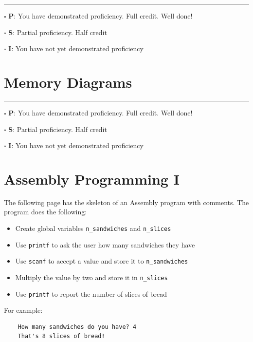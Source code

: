 \documentclass[12pt]{article}
\begin{document}
\vfill

\rule[1ex]{\textwidth}{.1pt}

$\square$ \textbf{P}: You have demonstrated proficiency. Full credit. Well done!

$\square$ \textbf{S}: Partial proficiency. Half credit

$\square$ \textbf{I}: You have not yet demonstrated proficiency

\newpage



\section*{Memory Diagrams}

\vfill

\rule[1ex]{\textwidth}{.1pt}

$\square$ \textbf{P}: You have demonstrated proficiency. Full credit. Well done!

$\square$ \textbf{S}: Partial proficiency. Half credit

$\square$ \textbf{I}: You have not yet demonstrated proficiency

\newpage



\section*{Assembly Programming I}

The following page has the skeleton of an Assembly program with comments. The program does the following:
\begin{itemize}
    \item Create global variables \texttt{n\_sandwiches} and \texttt{n\_slices}
    \item Use \texttt{printf} to ask the user how many sandwiches they have
    \item Use \texttt{scanf} to accept a value and store it to \texttt{n\_sandwiches}
    \item Multiply the value by two and store it in \texttt{n\_slices}
    \item Use \texttt{printf} to report the number of slices of bread
\end{itemize}

For example:
\begin{verbatim}
    How many sandwiches do you have? 4
    That's 8 slices of bread!
\end{verbatim}
\end{document}
